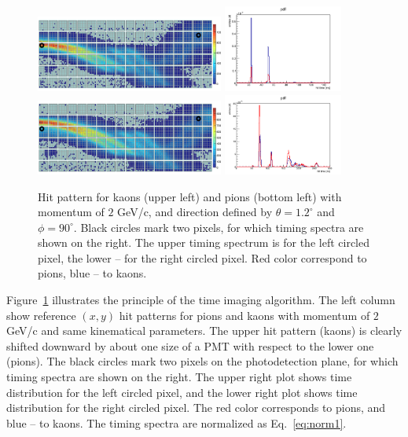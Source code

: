 \documentclass[11pt, a4paper]{article}
\begin{document}
\begin{figure}[!h]
\centering
\includegraphics[width=0.55\textwidth]{pics/kaonsTI.png} \hspace{0.05\textwidth} \includegraphics[width=0.35\textwidth]{pics/LeftPix.png} \\
\includegraphics[width=0.55\textwidth]{pics/pionsTI.png} \hspace{0.05\textwidth} \includegraphics[width=0.35\textwidth]{pics/rightPix.png} 
\caption{\label{pic:hitpatKpi}
Hit pattern for kaons (upper left) and pions (bottom left) with momentum of $2$ GeV/c, and direction defined by $\theta = 1.2^{\circ}$ and $\phi = 90^{\circ}$. Black circles mark two pixels, for which timing spectra are shown on the right. The upper timing spectrum is for the left circled pixel, the lower -- for the right circled pixel. Red color correspond to pions, blue -- to kaons.
}
\end{figure}
 
Figure~\ref{pic:hitpatKpi} illustrates the principle of the time imaging  algorithm. The left column show reference $(x, y)$ hit patterns for pions and kaons with momentum of $2$ GeV/c and same kinematical parameters. The upper hit pattern (kaons) is clearly shifted downward by about one size of a PMT with respect to the lower one (pions). The black circles mark two pixels on the photodetection plane, for which timing spectra are shown on the right. The upper right plot shows time distribution for the left circled pixel, and the lower right plot shows time distribution for the right circled pixel. The red color corresponds to pions, and blue -- to kaons. The timing spectra are normalized as Eq.~\ref{eq:norm1}.
\end{document}
